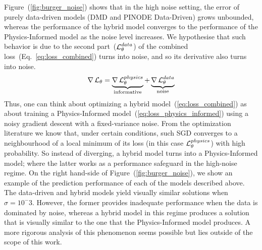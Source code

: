 Figure~(\ref{fig:burger_noise}) shows that in the high noise setting, the error of purely data-driven models (DMD and PINODE Data-Driven) grows unbounded, whereas the performance of the hybrid model converges to the performance of the Physics-Informed model as the noise level increases. We hypothesise that such behavior is due to the second part~($\operatorname{\mathcal{L}}_{\theta}^{data}$) of the combined loss~(Eq.~\ref{eq:loss_combined}) turns into noise, and so its derivative also turns into noise.
\begin{equation}
    \nabla \operatorname{\mathcal{L}}_{\theta} = \underbrace{\nabla\operatorname{\mathcal{L}}_{\theta}^{physics}}_{\text{informative}} + \underbrace{\nabla\operatorname{\mathcal{L}}_{\theta}^{data}}_{\text{noise}}
\end{equation}
Thus, one can think about optimizing a hybrid model~(\ref{eq:loss_combined}) as about training a Physics-Informed model~(\ref{eq:loss_physics_informed}) using a noisy gradient descent with a fixed-variance noise. From the optimization literature \citep{friedlander2012hybrid,patel2021global,shapiro2021lectures} we know that, under certain conditions, such SGD converges to a neighbourhood of a local minimum of its loss (in this case $\operatorname{\mathcal{L}}_{\theta}^{physics}$) with high probability. So instead of diverging, a hybrid model turns into a Physics-Informed model; where the latter works as a performance safeguard in the high-noise regime.  On the right hand-side of Figure~(\ref{fig:burger_noise}), we show an example of the prediction performance of each of the models described above. The data-driven and hybrid models yield visually similar solutions when $\sigma = 10^-3$. However, the former provides inadequate performance when the data is dominated by noise, whereas a hybrid model in this regime produces a solution that is visually similar to the one that the Physics-Informed model produces. A more rigorous analysis of this phenomenon seems possible but lies outside of the scope of this work.

